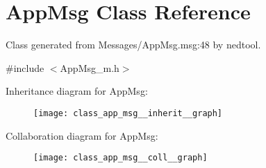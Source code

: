 \hypertarget{class_app_msg}{}\section{App\+Msg Class Reference}
\label{class_app_msg}


Class generated from {\ttfamily Messages/\+App\+Msg.\+msg\+:48} by nedtool.  




{\ttfamily \#include $<$App\+Msg\+\_\+m.\+h$>$}



Inheritance diagram for App\+Msg\+:\nopagebreak
\begin{figure}[H]
\begin{center}
\leavevmode
\texttt{[image: class\_app\_msg\_\_inherit\_\_graph]}
\end{center}
\end{figure}


Collaboration diagram for App\+Msg\+:\nopagebreak
\begin{figure}[H]
\begin{center}
\leavevmode
\texttt{[image: class\_app\_msg\_\_coll\_\_graph]}
\end{center}
\end{figure}
